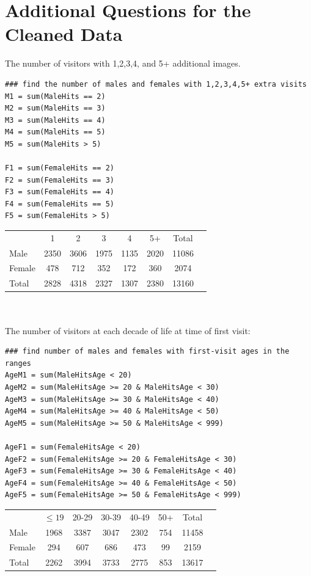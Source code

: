 \documentclass{article}
\begin{document}
\section{Additional Questions for the Cleaned Data}
The number of visitors with 1,2,3,4, and 5+ additional images.\\
\begin{verbatim}
### find the number of males and females with 1,2,3,4,5+ extra visits
M1 = sum(MaleHits == 2)
M2 = sum(MaleHits == 3)
M3 = sum(MaleHits == 4)
M4 = sum(MaleHits == 5)
M5 = sum(MaleHits > 5)

F1 = sum(FemaleHits == 2)
F2 = sum(FemaleHits == 3)
F3 = sum(FemaleHits == 4)
F4 = sum(FemaleHits == 5)
F5 = sum(FemaleHits > 5)
\end{verbatim}
\begin{tabular}{l*{6} c r}
       & 1 & 2 & 3 & 4 & 5+ & Total \\
Male   & 2350 & 3606 & 1975 & 1135 & 2020 & 11086 \\
Female & 478 & 712 & 352 & 172 & 360 & 2074 \\
Total  & 2828 & 4318 & 2327 & 1307 & 2380 & 13160 \\
\end{tabular}\\\\


The number of visitors at each decade of life at time of first visit:\\

\begin{verbatim}
### find number of males and females with first-visit ages in the ranges
AgeM1 = sum(MaleHitsAge < 20)
AgeM2 = sum(MaleHitsAge >= 20 & MaleHitsAge < 30)
AgeM3 = sum(MaleHitsAge >= 30 & MaleHitsAge < 40)
AgeM4 = sum(MaleHitsAge >= 40 & MaleHitsAge < 50)
AgeM5 = sum(MaleHitsAge >= 50 & MaleHitsAge < 999)

AgeF1 = sum(FemaleHitsAge < 20)
AgeF2 = sum(FemaleHitsAge >= 20 & FemaleHitsAge < 30)
AgeF3 = sum(FemaleHitsAge >= 30 & FemaleHitsAge < 40)
AgeF4 = sum(FemaleHitsAge >= 40 & FemaleHitsAge < 50)
AgeF5 = sum(FemaleHitsAge >= 50 & FemaleHitsAge < 999)
\end{verbatim}

\begin{tabular}{l*{6} c r}
       & $\leq19$ & 20-29 & 30-39 & 40-49 & 50+ & Total \\
Male   & 1968 & 3387 & 3047 & 2302 & 754 & 11458 \\
Female & 294 & 607 & 686 & 473 & 99 & 2159 \\
Total  & 2262 & 3994 & 3733 & 2775 & 853 & 13617 \\
\end{tabular}\\
\end{document}
